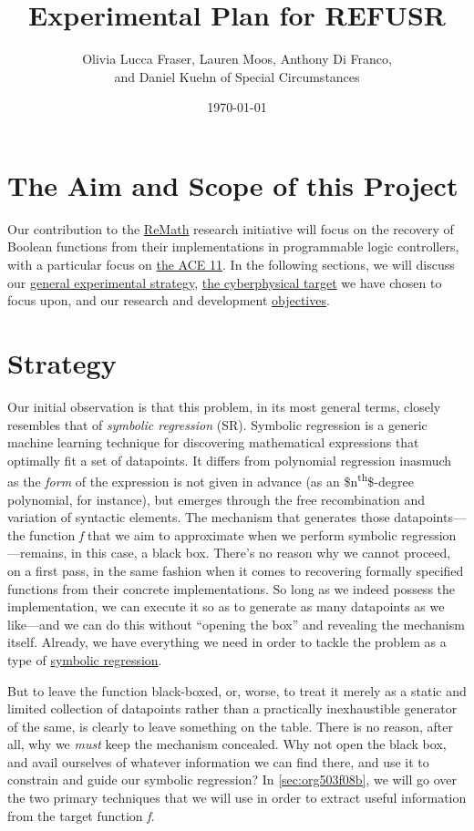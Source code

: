 \documentclass[11pt]{article}
\author{Olivia Lucca Fraser, Lauren Moos, Anthony Di Franco, \\ and Daniel Kuehn of Special Circumstances}
\date{\today}
\title{Experimental Plan for REFUSR}
\begin{document}
\maketitle
\tableofcontents



\section{The Aim and Scope of this Project}
\label{sec:orgec82541}
Our contribution to the \href{https://beta.sam.gov/opp/667875ba2f464ccfa38688ea1a718fe7/view}{ReMath} research initiative will focus on the recovery of Boolean functions from their implementations in programmable logic controllers, with a particular focus on \hyperref[sec:orga8f1d4c]{the ACE 11}. In the following sections, we will discuss our \hyperref[sec:orgc185337]{general experimental strategy}, \hyperref[sec:orga8f1d4c]{the cyberphysical target} we have chosen to focus upon, and our research and development \hyperref[sec:orgde507df]{objectives}.

\section{Strategy}
\label{sec:orgc185337}
Our initial observation is that this problem, in its most general terms, closely resembles that of \emph{symbolic regression} (SR). Symbolic regression is a generic machine learning technique for discovering mathematical expressions that optimally fit a set of datapoints. It differs from polynomial regression inasmuch as the \emph{form} of the expression is not given in advance (as an \$n\textsuperscript{th}\$-degree polynomial, for instance), but emerges through the free recombination and variation of syntactic elements. The mechanism that generates those datapoints---the function \emph{f} that we aim to approximate when we perform symbolic regression---remains, in this case, a black box. There's no reason why we cannot proceed, on a first pass, in the same fashion when it comes to recovering formally specified functions from their concrete implementations. So long as we indeed possess the implementation, we can execute it so as to generate as many datapoints as we like---and we can do this without ``opening the box'' and revealing the mechanism itself. Already, we have everything we need in order to tackle the problem as a type of \hyperref[sec:orgceca113]{symbolic regression}.

But to leave the function black-boxed, or, worse, to treat it merely as a static and limited collection of datapoints rather than a practically inexhaustible generator of the same, is clearly to leave something on the table. There is no reason, after all, why we \emph{must} keep the mechanism concealed. Why not open the black box, and avail ourselves of whatever information we can find there, and use it to constrain and guide our symbolic regression? In \ref{sec:org503f08b}, we will go over the two primary techniques that we will use in order to extract useful information from the target function \emph{f}.
\end{document}
